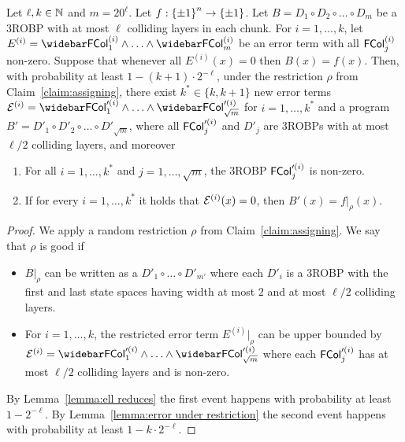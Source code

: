 {\begin{lemma}\label{lemma:main}
Let $\ell, k \in {\mathbb{N}}$ and $m = 20^\ell$.
Let $f: {\{\pm1\}}^n \to {\{\pm1\}}$.
Let $B = D_1 \circ D_2 \circ \ldots \circ D_m$ be a 3ROBP with at most $\ell$ colliding layers in each chunk.
For $i= 1, \ldots, k$, let $E^{(i)} = \bar{\FCol^{(i)}_1} \wedge \ldots \wedge \bar{\FCol^{(i)}_{m}}$ be an error term with all ${\mathsf{FCol}}^{(i)}_j$ non-zero.
Suppose that whenever all $E^{(i)}(x)=0$ then $B(x) = f(x)$.
Then, with probability at least $1-(k+1)\cdot 2^{-\ell}$, under the restriction $\rho$ from Claim~\ref{claim:assigning},  there exist
$k^* \in \{k, k+1\}$ new error terms
$\mE^{(i)} = \bar{\FCol'^{(i)}_1} \wedge \ldots \wedge \bar{\FCol'^{(i)}_{\sqrt{m}}}$ for $i=1, \ldots, k^{*}$ and a program	
 $B' = D'_1 \circ D'_2 \circ \ldots \circ D'_{\sqrt{m}}$,
where all ${\mathsf{FCol}}'^{(i)}_j$ and $D'_j$ are 3ROBPs with at most $\ell/2$ colliding layers, and moreover
\begin{enumerate}
	\item 
	For all $i=1, \ldots, k^{*}$ and $j=1, \ldots, \sqrt{m}$, the 3ROBP ${\mathsf{FCol}}'^{(i)}_j$ is non-zero.
\item If for every $i=1,\ldots,k^{*}$ it holds that  ${\mathcal{E}}^{(i)}(x) =0$, then $B'(x) = f|_{\rho}(x)$.
\end{enumerate}
\end{lemma}
\begin{proof}
We apply a random restriction $\rho$ from Claim~\ref{claim:assigning}.
We say that $\rho$ is good if 
\begin{itemize}
	\item $B|_{\rho}$ can be written as a $D'_1 \circ \ldots \circ D'_{m'}$ where each $D'_i$ is a 3ROBP with the first and last state spaces having width at most $2$ and at most $\ell/2$ colliding layers.
	\item For $i=1, \ldots, k$, the restricted error term $E^{(i)}|_{\rho}$ can be upper bounded by $\mE^{(i)} = \bar{\FCol'^{(i)}_1} \wedge \ldots \wedge \bar{\FCol'^{(i)}_{\sqrt{m}}}$ where each ${\mathsf{FCol}}'^{(i)}_{j}$ has at most $\ell/2$ colliding layers and is non-zero.
\end{itemize}
By Lemma~\ref{lemma:ell reduces} the first event happens with probability at least $1-2^{-\ell}$.
By Lemma~\ref{lemma:error under restriction} the second event happens with probability at least $1-k\cdot 2^{-\ell}$.
	

\end{proof}}
